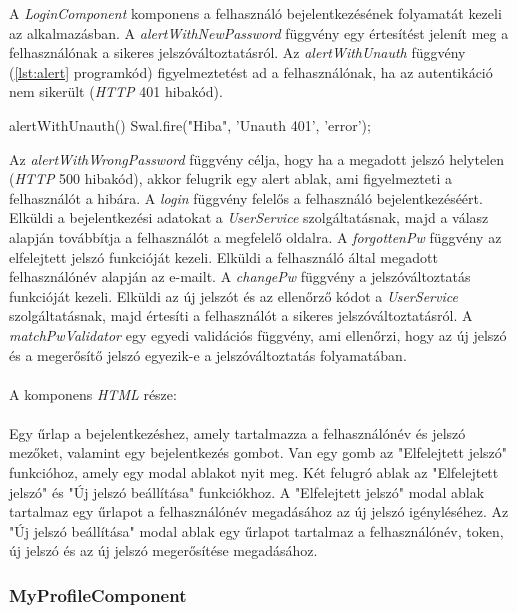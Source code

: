 A \textit{LoginComponent} komponens a felhasználó bejelentkezésének folyamatát kezeli az  alkalmazásban. A \textit{alertWithNewPassword} függvény egy értesítést jelenít meg a felhasználónak a sikeres jelszóváltoztatásról. Az \textit{alertWithUnauth} függvény (\ref{lst:alert} programkód) figyelmeztetést ad a felhasználónak, ha az autentikáció nem sikerült (\textit{HTTP} 401 hibakód). 
\begin{typescript}[caption={A figyelmeztető szöveg beállítása},captionpos=b, label={lst:alert}]
alertWithUnauth() {
    Swal.fire("Hiba", 'Unauth 401',  'error');
}
\end{typescript}
Az \textit{alertWithWrongPassword} függvény célja, hogy ha a megadott jelszó helytelen (\textit{HTTP} 500 hibakód), akkor felugrik egy alert ablak, ami figyelmezteti a felhasználót a hibára. A \textit{login} függvény felelős a felhasználó bejelentkezéséért. Elküldi a bejelentkezési adatokat a \textit{UserService} szolgáltatásnak, majd a válasz alapján továbbítja a felhasználót a megfelelő oldalra. A \textit{forgottenPw} függvény az elfelejtett jelszó funkcióját kezeli. Elküldi a felhasználó által megadott felhasználónév alapján az e-mailt. A \textit{changePw} függvény a jelszóváltoztatás funkcióját kezeli. Elküldi az új jelszót és az ellenőrző kódot a \textit{UserService} szolgáltatásnak, majd értesíti a felhasználót a sikeres jelszóváltoztatásról. A \textit{matchPwValidator} egy egyedi validációs függvény, ami ellenőrzi, hogy az új jelszó és a megerősítő jelszó egyezik-e a jelszóváltoztatás folyamatában.\\
\\
A komponens \textit{HTML} része:\\
\\
Egy űrlap a bejelentkezéshez, amely tartalmazza a felhasználónév és jelszó mezőket, valamint egy bejelentkezés gombot. Van egy gomb az "Elfelejtett jelszó" funkcióhoz, amely egy modal ablakot nyit meg. Két felugró ablak az "Elfelejtett jelszó" és "Új jelszó beállítása" funkciókhoz. A "Elfelejtett jelszó" modal ablak tartalmaz egy űrlapot a felhasználónév megadásához az új jelszó igényléséhez. Az "Új jelszó beállítása" modal ablak egy űrlapot tartalmaz a felhasználónév, token, új jelszó és az új jelszó megerősítése megadásához.


\subsubsection{MyProfileComponent}


